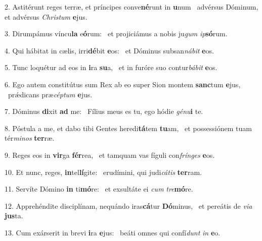 2. Astitérunt reges terræ, et príncipes conve\textbf{né}runt in \textbf{u}num \ast\  advérsus Dóminum, et advérsus \textit{Chris}\textit{tum} \textbf{e}jus.\

3. Dirumpámus víncu\textbf{la} e\textbf{ó}rum: \ast\  et projiciámus a nobis ju\textit{gum} \textit{ip}\textbf{só}rum.\

4. Qui hábitat in cælis, irri\textbf{dé}bit \textbf{e}os: \ast\  et Dóminus subsan\textit{ná}\textit{bit} \textbf{e}os.\

5. Tunc loquétur ad eos in \textbf{i}ra \textbf{su}a, \ast\  et in furóre suo contur\textit{bá}\textit{bit} \textbf{e}os.\

6. Ego autem constitútus sum Rex ab eo super Sion montem \textbf{sanc}tum \textbf{e}jus, \ast\  prǽdicans præ\textit{cép}\textit{tum} \textbf{e}jus.\

7. Dóminus \textbf{di}xit \textbf{ad} me: \ast\  Fílius meus es tu, ego hódie \textit{gé}\textit{nu}\textbf{i} te.\

8. Póstula a me, et dabo tibi Gentes heredi\textbf{tá}tem \textbf{tu}am, \ast\  et possessiónem tuam tér\textit{mi}\textit{nos} \textbf{ter}ræ.\

9. Reges eos in \textbf{vir}ga \textbf{fér}rea, \ast\  et tamquam vas fíguli con\textit{frín}\textit{ges} \textbf{e}os.\

10. Et nunc, reges, \textbf{in}tel\textbf{lí}gite: \ast\  erudímini, qui judi\textit{cá}\textit{tis} \textbf{ter}ram.\

11. Servíte Dómino \textbf{in} ti\textbf{mó}re: \ast\  et exsultáte ei \textit{cum} \textit{tre}\textbf{mó}re.\

12. Apprehéndite disciplínam, nequándo iras\textbf{cá}tur \textbf{Dó}minus, \ast\  et pereátis de \textit{vi}\textit{a} \textbf{jus}ta.\

13. Cum exárserit in brevi \textbf{i}ra \textbf{e}jus: \ast\  beáti omnes qui confí\textit{dunt} \textit{in} \textbf{e}o.\

